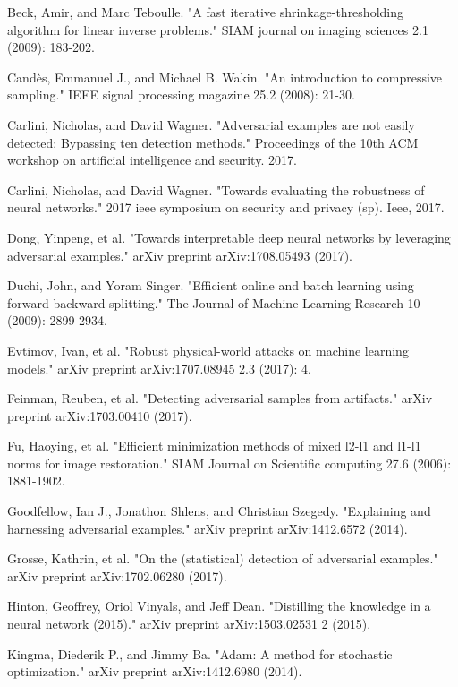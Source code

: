 \begin{thebibliography}{9}
    \bibitem{}
    Beck, Amir, and Marc Teboulle. "A fast iterative shrinkage-thresholding algorithm for linear inverse problems." SIAM journal on imaging sciences 2.1 (2009): 183-202.
        
    \bibitem{}
    Candès, Emmanuel J., and Michael B. Wakin. "An introduction to compressive sampling." IEEE signal processing magazine 25.2 (2008): 21-30.

    \bibitem{}
    Carlini, Nicholas, and David Wagner. "Adversarial examples are not easily detected: Bypassing ten detection methods." Proceedings of the 10th ACM workshop on artificial intelligence and security. 2017.

    \bibitem{}
    Carlini, Nicholas, and David Wagner. "Towards evaluating the robustness of neural networks." 2017 ieee symposium on security and privacy (sp). Ieee, 2017.

    \bibitem{}
    Dong, Yinpeng, et al. "Towards interpretable deep neural networks by leveraging adversarial examples." arXiv preprint arXiv:1708.05493 (2017).

    \bibitem{}
    Duchi, John, and Yoram Singer. "Efficient online and batch learning using forward backward splitting." The Journal of Machine Learning Research 10 (2009): 2899-2934.

    \bibitem{}
    Evtimov, Ivan, et al. "Robust physical-world attacks on machine learning models." arXiv preprint arXiv:1707.08945 2.3 (2017): 4.

    \bibitem{}
    Feinman, Reuben, et al. "Detecting adversarial samples from artifacts." arXiv preprint arXiv:1703.00410 (2017).

    \bibitem{}
    Fu, Haoying, et al. "Efficient minimization methods of mixed l2-l1 and l1-l1 norms for image restoration." SIAM Journal on Scientific computing 27.6 (2006): 1881-1902.

    \bibitem{}
    Goodfellow, Ian J., Jonathon Shlens, and Christian Szegedy. "Explaining and harnessing adversarial examples." arXiv preprint arXiv:1412.6572 (2014).

    \bibitem{}
    Grosse, Kathrin, et al. "On the (statistical) detection of adversarial examples." arXiv preprint arXiv:1702.06280 (2017).

    \bibitem{}
    Hinton, Geoffrey, Oriol Vinyals, and Jeff Dean. "Distilling the knowledge in a neural network (2015)." arXiv preprint arXiv:1503.02531 2 (2015).

    \bibitem{}
    Kingma, Diederik P., and Jimmy Ba. "Adam: A method for stochastic optimization." arXiv preprint arXiv:1412.6980 (2014).


\end{thebibliography}
